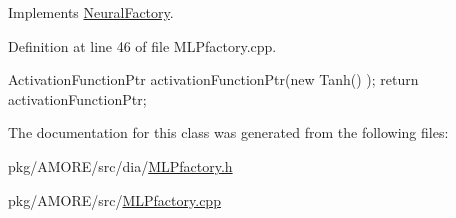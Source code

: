 Implements \hyperlink{class_neural_factory_a7551643129b608ea6601cd18f2bfb011}{NeuralFactory}.



Definition at line 46 of file MLPfactory.cpp.


\begin{DoxyCode}
                                      {
  ActivationFunctionPtr activationFunctionPtr(new Tanh() );
  return activationFunctionPtr;
}
\end{DoxyCode}


The documentation for this class was generated from the following files:\begin{DoxyCompactItemize}
\item 
pkg/AMORE/src/dia/\hyperlink{_m_l_pfactory_8h}{MLPfactory.h}\item 
pkg/AMORE/src/\hyperlink{_m_l_pfactory_8cpp}{MLPfactory.cpp}\end{DoxyCompactItemize}
